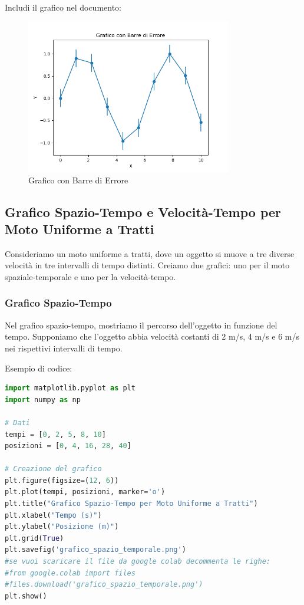 Includi il grafico nel documento:
\begin{figure}[h!]
    \centering
    \includegraphics[width=0.8\textwidth]{grafico_barre_errore.png}
    \caption{Grafico con Barre di Errore}
    \label{fig:barre_errore}
\end{figure}

\subsection{Grafico Spazio-Tempo e Velocità-Tempo per Moto Uniforme a Tratti}
Consideriamo un moto uniforme a tratti, dove un oggetto si muove a tre diverse velocità in tre intervalli di tempo distinti. Creiamo due grafici: uno per il moto spaziale-temporale e uno per la velocità-tempo.

\subsubsection{Grafico Spazio-Tempo}
Nel grafico spazio-tempo, mostriamo il percorso dell'oggetto in funzione del tempo. Supponiamo che l'oggetto abbia velocità costanti di 2 m/s, 4 m/s e 6 m/s nei rispettivi intervalli di tempo.

Esempio di codice:
\begin{lstlisting}[language=Python]
import matplotlib.pyplot as plt
import numpy as np

# Dati
tempi = [0, 2, 5, 8, 10]
posizioni = [0, 4, 16, 28, 40]

# Creazione del grafico
plt.figure(figsize=(12, 6))
plt.plot(tempi, posizioni, marker='o')
plt.title("Grafico Spazio-Tempo per Moto Uniforme a Tratti")
plt.xlabel("Tempo (s)")
plt.ylabel("Posizione (m)")
plt.grid(True)
plt.savefig('grafico_spazio_temporale.png')
#se vuoi scaricare il file da google colab decommenta le righe:
#from google.colab import files
#files.download('grafico_spazio_temporale.png')
plt.show()
\end{lstlisting}

